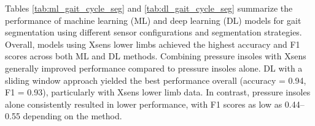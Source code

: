 \documentclass[sensors,article,submit,pdftex,moreauthors]{Definitions/mdpi}
\begin{document}
\begin{table}[ht]
\centering
\caption{Performance Metrics for Different Sensor Configurations of the Deep Learning Approach}
\label{tab:dl_gait_cycle_seg}
\end{table}
Tables \ref{tab:ml_gait_cycle_seg} and \ref{tab:dl_gait_cycle_seg} summarize the performance of machine learning (ML) and deep learning (DL) models for gait segmentation using different sensor configurations and segmentation strategies. Overall, models using Xsens lower limbs achieved the highest accuracy and F1 scores across both ML and DL methods. Combining pressure insoles with Xsens generally improved performance compared to pressure insoles alone. DL with a sliding window approach yielded the best performance overall (accuracy = 0.94, F1 = 0.93), particularly with Xsens lower limb data. In contrast, pressure insoles alone consistently resulted in lower performance, with F1 scores as low as 0.44–0.55 depending on the method.

\FloatBarrier
\end{document}
